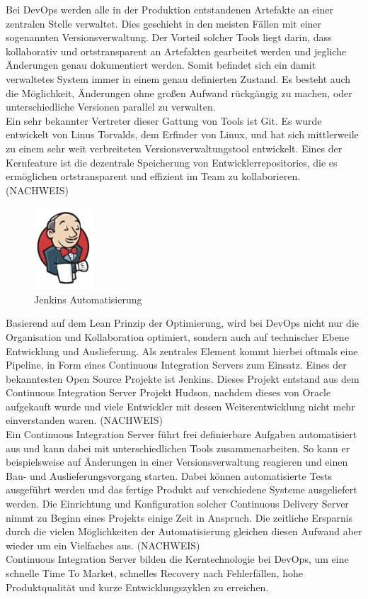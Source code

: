 Bei DevOps werden alle in der Produktion entstandenen Artefakte an einer zentralen Stelle verwaltet. Dies geschieht in den meisten Fällen mit einer sogenannten Versionsverwaltung. Der Vorteil solcher Tools liegt darin, dass kollaborativ und ortstransparent an Artefakten gearbeitet werden und jegliche Änderungen genau dokumentiert werden. Somit befindet sich ein damit verwaltetes System immer in einem genau definierten Zustand. Es besteht auch die Möglichkeit, Änderungen ohne großen Aufwand rückgängig zu machen, oder unterschiedliche Versionen parallel zu verwalten.\\
Ein sehr bekannter Vertreter dieser Gattung von Tools ist Git. Es wurde entwickelt von Linus Torvalds, dem Erfinder von Linux, und hat sich mittlerweile zu einem sehr weit verbreiteten Versionsverwaltungstool entwickelt. Eines der Kernfeature ist die dezentrale Speicherung von Entwicklerrepositories, die es ermöglichen ortstransparent und effizient im Team zu kollaborieren. (NACHWEIS)

\begin{figure}[ht]
  \centering
  \includegraphics[width=0.2\textwidth]{img/jenkins_logo.png}
  \caption{Jenkins Automatisierung \parencite[][]{Jenkins:2016}}
  \label{fig:scrummodell}
\end{figure}

Basierend auf dem Lean Prinzip der Optimierung, wird bei DevOps nicht nur die Organisation und Kollaboration optimiert, sondern auch auf technischer Ebene Entwicklung und Auslieferung. Als zentrales Element kommt hierbei oftmals eine Pipeline, in Form eines Continuous Integration Servers zum Einsatz. Eines der bekanntesten Open Source Projekte ist Jenkins. Dieses Projekt entstand aus dem Continuous Integration Server Projekt Hudson, nachdem dieses von Oracle aufgekauft wurde und viele Entwickler mit dessen Weiterentwicklung nicht mehr einverstanden waren. (NACHWEIS)\\
Ein Continuous Integration Server führt frei definierbare Aufgaben automatisiert aus und kann dabei mit unterschiedlichen Tools zusammenarbeiten. So kann er beispielsweise auf Änderungen in einer Versionsverwaltung reagieren und einen Bau- und Auslieferungsvorgang starten. Dabei können automatisierte Tests ausgeführt werden und das fertige Produkt auf verschiedene Systeme ausgeliefert werden. Die Einrichtung und Konfiguration solcher Continuous Delivery Server nimmt zu Beginn eines Projekts einige Zeit in Anspruch. Die zeitliche Ersparnis durch die vielen Möglichkeiten der Automatisierung gleichen diesen Aufwand aber wieder um ein Vielfaches aus. (NACHWEIS)\\
Continuous Integration Server bilden die Kerntechnologie bei DevOps, um eine schnelle Time To Market, schnelles Recovery nach Fehlerfällen, hohe Produktqualität und kurze Entwicklungszyklen zu erreichen.


